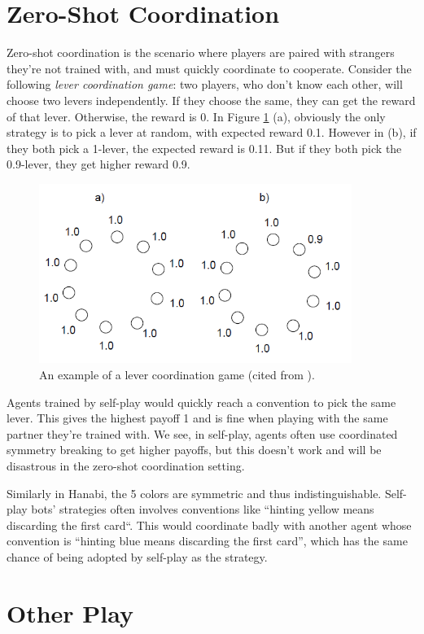 \documentclass[12pt]{article}
\begin{document}
\begin{spacing}{1.15}
\section{Zero-Shot Coordination}

Zero-shot coordination is the scenario where players are paired with strangers they're not trained with, and must quickly coordinate to cooperate. Consider the following \textsl{lever coordination game}: two players, who don't know each other, will choose two levers independently. If they choose the same, they can get the reward of that lever. Otherwise, the reward is 0. In Figure \ref{Fig2} (a), obviously the only strategy is to pick a lever at random, with expected reward 0.1. However in (b), if they both pick a 1-lever, the expected reward is 0.11. But if they both pick the 0.9-lever, they get higher reward 0.9.

\begin{figure}[H]
\centerline{\includegraphics[width=4in]{fig2.png}}
\caption{An example of a lever coordination game (cited from \cite{hu2020other}).}
\label{Fig2}
\end{figure}

Agents trained by self-play would quickly reach a convention to pick the same lever. This gives the highest payoff 1 and is fine when playing with the same partner they're trained with. We see, in self-play, agents often use coordinated symmetry breaking to get higher payoffs, but this doesn't work and will be disastrous in the zero-shot coordination setting.

Similarly in Hanabi, the 5 colors are symmetric and thus indistinguishable. Self-play bots' strategies often involves conventions like ``hinting yellow means discarding the first card``. This would coordinate badly with another agent whose convention is ``hinting blue means discarding the first card'', which has the same chance of being adopted by self-play as the strategy.

\section{Other Play}
\renewcommand\S{{\mathcal S}}
\renewcommand\O{{\mathcal O}}
\newcommand\A{{\mathcal A}}


\end{spacing}
\end{document}
